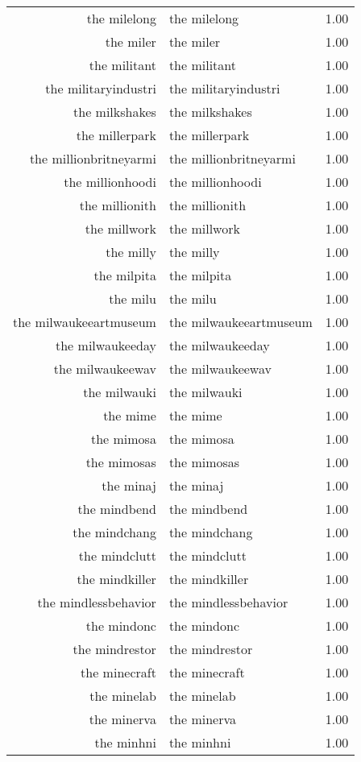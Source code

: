\begin{table}[ht]
\begin{tabular}{rlr}
  the milelong & the milelong & 1.00 \\ 
  the miler & the miler & 1.00 \\ 
  the militant & the militant & 1.00 \\ 
  the militaryindustri & the militaryindustri & 1.00 \\ 
  the milkshakes & the milkshakes & 1.00 \\ 
  the millerpark & the millerpark & 1.00 \\ 
  the millionbritneyarmi & the millionbritneyarmi & 1.00 \\ 
  the millionhoodi & the millionhoodi & 1.00 \\ 
  the millionith & the millionith & 1.00 \\ 
  the millwork & the millwork & 1.00 \\ 
  the milly & the milly & 1.00 \\ 
  the milpita & the milpita & 1.00 \\ 
  the milu & the milu & 1.00 \\ 
  the milwaukeeartmuseum & the milwaukeeartmuseum & 1.00 \\ 
  the milwaukeeday & the milwaukeeday & 1.00 \\ 
  the milwaukeewav & the milwaukeewav & 1.00 \\ 
  the milwauki & the milwauki & 1.00 \\ 
  the mime & the mime & 1.00 \\ 
  the mimosa & the mimosa & 1.00 \\ 
  the mimosas & the mimosas & 1.00 \\ 
  the minaj & the minaj & 1.00 \\ 
  the mindbend & the mindbend & 1.00 \\ 
  the mindchang & the mindchang & 1.00 \\ 
  the mindclutt & the mindclutt & 1.00 \\ 
  the mindkiller & the mindkiller & 1.00 \\ 
  the mindlessbehavior & the mindlessbehavior & 1.00 \\ 
  the mindonc & the mindonc & 1.00 \\ 
  the mindrestor & the mindrestor & 1.00 \\ 
  the minecraft & the minecraft & 1.00 \\ 
  the minelab & the minelab & 1.00 \\ 
  the minerva & the minerva & 1.00 \\ 
  the minhni & the minhni & 1.00 \\ 

\end{tabular}
\end{table}
